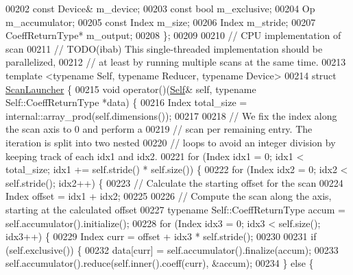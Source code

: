 \begin{DoxyCode}
00202   \textcolor{keyword}{const} Device& m\_device;
00203   \textcolor{keyword}{const} \textcolor{keywordtype}{bool} m\_exclusive;
00204   Op m\_accumulator;
00205   \textcolor{keyword}{const} Index m\_size;
00206   Index m\_stride;
00207   CoeffReturnType* m\_output;
00208 \};
00209 
00210 \textcolor{comment}{// CPU implementation of scan}
00211 \textcolor{comment}{// TODO(ibab) This single-threaded implementation should be parallelized,}
00212 \textcolor{comment}{// at least by running multiple scans at the same time.}
00213 \textcolor{keyword}{template} <\textcolor{keyword}{typename} Self, \textcolor{keyword}{typename} Reducer, \textcolor{keyword}{typename} Device>
00214 \textcolor{keyword}{struct }\hyperlink{struct_eigen_1_1_scan_launcher}{ScanLauncher} \{
00215   \textcolor{keywordtype}{void} operator()(\hyperlink{struct_eigen_1_1_tensor_evaluator_3_01const_01_tensor_scan_op_3_01_op_00_01_arg_type_01_4_00_01_device_01_4}{Self}& \textcolor{keyword}{self}, \textcolor{keyword}{typename} Self::CoeffReturnType *data) \{
00216     Index total\_size = internal::array\_prod(\textcolor{keyword}{self}.dimensions());
00217 
00218     \textcolor{comment}{// We fix the index along the scan axis to 0 and perform a}
00219     \textcolor{comment}{// scan per remaining entry. The iteration is split into two nested}
00220     \textcolor{comment}{// loops to avoid an integer division by keeping track of each idx1 and idx2.}
00221     \textcolor{keywordflow}{for} (Index idx1 = 0; idx1 < total\_size; idx1 += \textcolor{keyword}{self}.stride() * \textcolor{keyword}{self}.size()) \{
00222       \textcolor{keywordflow}{for} (Index idx2 = 0; idx2 < \textcolor{keyword}{self}.stride(); idx2++) \{
00223         \textcolor{comment}{// Calculate the starting offset for the scan}
00224         Index offset = idx1 + idx2;
00225 
00226         \textcolor{comment}{// Compute the scan along the axis, starting at the calculated offset}
00227         \textcolor{keyword}{typename} Self::CoeffReturnType accum = \textcolor{keyword}{self}.accumulator().initialize();
00228         \textcolor{keywordflow}{for} (Index idx3 = 0; idx3 < \textcolor{keyword}{self}.size(); idx3++) \{
00229           Index curr = offset + idx3 * \textcolor{keyword}{self}.stride();
00230 
00231           \textcolor{keywordflow}{if} (\textcolor{keyword}{self}.exclusive()) \{
00232             data[curr] = \textcolor{keyword}{self}.accumulator().finalize(accum);
00233             \textcolor{keyword}{self}.accumulator().reduce(\textcolor{keyword}{self}.inner().coeff(curr), &accum);
00234           \} \textcolor{keywordflow}{else} \{

\end{DoxyCode}
